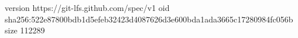 version https://git-lfs.github.com/spec/v1
oid sha256:522e87800bdb1d5efeb32423d4087626d3e600bda1ada3665c17280984fc056b
size 112289
